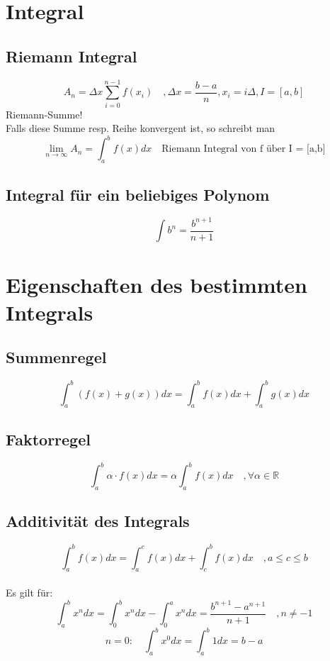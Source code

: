 \section{Integral}
\subsection{Riemann Integral}
\[ \boxed{A_n = \Delta x \sum_{i=0}^{n-1} f(x_i) \quad 
, \Delta x = \frac{b - a}{n} , x_i = i \Delta , I = [a,b]} \]
Riemann-Summe! \\
Falls diese Summe resp. Reihe konvergent ist, so schreibt man
\[ \boxed{\lim_{n \rightarrow \infty} A_n = \int_{a}^{b} f(x) d x \quad \text{Riemann Integral von f über I = [a,b]} } \]

\subsection{Integral für ein beliebiges Polynom}
\[ \boxed{\int b^n = \frac{b^{n + 1}}{n + 1}} \]

\section{Eigenschaften des bestimmten Integrals}

\subsection{Summenregel}
\[ \boxed{\int_a^b (f(x) + g(x)) dx = \int_a^b f(x) dx + \int_a^b g(x) dx} \]

\subsection{Faktorregel}
\[ \boxed{\int_a^b \alpha \cdot f(x) dx = \alpha \int_a^b f(x) dx \quad , \forall \alpha \in \mathbb{R}} \]

\subsection{Additivität des Integrals}
\[ \boxed{\int_a^b f(x) dx = \int_a^c f(x) dx + \int_c^b f(x) dx \quad , a \leq c \leq b} \]
\\
Es gilt für: 
\[ \boxed{\int_a^b x^n dx = \int_0^b x^n dx - \int_0^a x^n dx = \frac{b^{n+1} - a^{n+1}}{n + 1} \quad , n \neq -1} \]
\[ \boxed{n = 0: \quad \int_a^b x^0 dx = \int_a^b 1 dx = b - a} \]